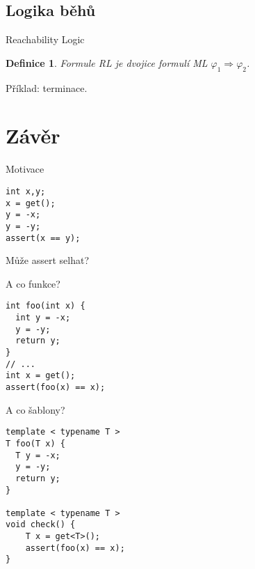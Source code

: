 \documentclass[11pt]{beamer}
\newtheorem{dfn}{Definice}
\begin{document}

\subsection{Logika běhů}

\begin{frame}{Reachability Logic}

\begin{dfn}
Formule RL je dvojice formulí ML $\varphi_1 \Rightarrow \varphi_2$.
\end{dfn}
\pause
Příklad: terminace.

\end{frame}


\section{Závěr}


\begin{frame}[fragile]{Motivace}

\begin{lstlisting}
int x,y;
x = get();
y = -x;
y = -y;
assert(x == y);
\end{lstlisting}

Může assert selhat?

\end{frame}


\begin{frame}[fragile]{A co funkce?}
\begin{lstlisting}
int foo(int x) {
  int y = -x;
  y = -y;
  return y;
}
// ...
int x = get();
assert(foo(x) == x);
\end{lstlisting}
\end{frame}


\begin{frame}[fragile]{A co šablony?}
\begin{lstlisting}
template < typename T >
T foo(T x) {
  T y = -x;
  y = -y;
  return y;
}

template < typename T >
void check() {
    T x = get<T>();
    assert(foo(x) == x);
}
\end{lstlisting}
\end{frame}
\end{document}
